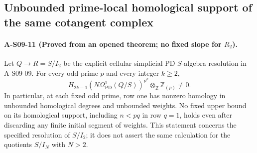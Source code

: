 \subsection{Unbounded prime-local homological support of the same cotangent complex}

\paragraph{A-S09-11 (Proved from an opened theorem; no fixed slope for $R_2$).}
Let $Q\to R=S/I_2$ be the explicit cellular simplicial PD
$S$-algebra resolution in A-S09-09.  For every odd prime $p$ and
every integer $k\geq2$,
\[
 H_{2k-1}\!\left(N\Omega^1_{\mathrm{PD}}(Q/S)\right)^{p^k}
       \otimes_{\mathbb Z}\mathbb Z_{(p)}\ne0.
 \tag{S09.15}
\]
In particular, at each fixed odd prime, row one has nonzero
homology in unbounded homological degrees and unbounded weights.
No fixed upper bound on its homological support, including
$n<pq$ in row $q=1$, holds even after discarding any finite
initial segment of weights.  This statement concerns the specified
resolution of $S/I_2$; it does not assert the same calculation
for the quotients $S/I_N$ with $N>2$.

